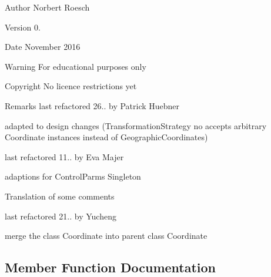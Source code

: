 \begin{DoxyAuthor}{Author}
Norbert Roesch 
\end{DoxyAuthor}
\begin{DoxyVersion}{Version}
0. 
\end{DoxyVersion}
\begin{DoxyDate}{Date}
November 2016 
\end{DoxyDate}
\begin{DoxyWarning}{Warning}
For educational purposes only 
\end{DoxyWarning}
\begin{DoxyCopyright}{Copyright}
No licence restrictions yet 
\end{DoxyCopyright}
\begin{DoxyRemark}{Remarks}
last refactored 26.. by Patrick Huebner ~\newline
 
\begin{DoxyItemize}
\item adapted to design changes (Transformation\+Strategy no accepts arbitrary Coordinate instances instead of Geographic\+Coordinates) 
\end{DoxyItemize}

last refactored 11.. by Eva Majer ~\newline
 
\begin{DoxyItemize}
\item adaptions for Control\+Parms Singleton 
\item Translation of some comments 
\end{DoxyItemize}

last refactored 21.. by Yucheng ~\newline
 
\begin{DoxyItemize}
\item merge the class \textquotesingle{}Coordinate\textquotesingle{} into parent class \textquotesingle{}Coordinate\textquotesingle{}  
\end{DoxyItemize}
\end{DoxyRemark}


\subsection{Member Function Documentation}
\mbox{\label{class_transformation_afe43b1123ddd254a15446af548bd251f}} 
